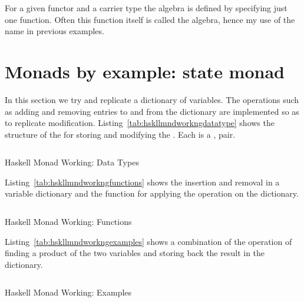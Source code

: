 \documentclass[proposal.tex]{subfiles}
\begin{document}
For a given functor  and a carrier type  the algebra is defined by specifying just one function.
Often this function itself is called the algebra, hence my use of the name  in previous examples.


\section{Monads by example: state monad}

In this section we try and replicate a dictionary of variables. The operations such as adding and removing entries to and from the
dictionary are implemented so as to replicate modification. Listing~\ref{tab:hskllmndworkngdatatype} shows the structure of the 
 for storing and modifying the . Each  is a ,  pair.
 
\begin{code-list}[H]
  \begin{singlespace}
    \inputminted[linenos, firstline=22, lastline=33]{haskell}{haskell-monad-working-2.hs}
  \end{singlespace}
  \caption{Haskell Monad Working: Data Types}
\label{tab:hskllmndworkngdatatype}
\end{code-list}

Listing~\ref{tab:hskllmndworkngfunctions} shows the insertion and removal in a variable dictionary and the  function 
for applying the operation on the dictionary.

\begin{code-list}[H]
  \begin{singlespace}
    \inputminted[linenos, firstline=35, lastline=76]{haskell}{haskell-monad-working-2.hs}
  \end{singlespace}
  \caption{Haskell Monad Working: Functions}
\label{tab:hskllmndworkngfunctions}
\end{code-list}

Listing~\ref{tab:hskllmndworkngexamples} shows a combination of the operation of finding a product of the two variables and 
storing back the result in the dictionary.


\begin{code-list}[H]
  \begin{singlespace}
    \inputminted[linenos, firstline=81, lastline=123]{haskell}{haskell-monad-working-2.hs}
  \end{singlespace}
  \caption{Haskell Monad Working: Examples}
\label{tab:hskllmndworkngexamples}
\end{code-list}
\end{document}
